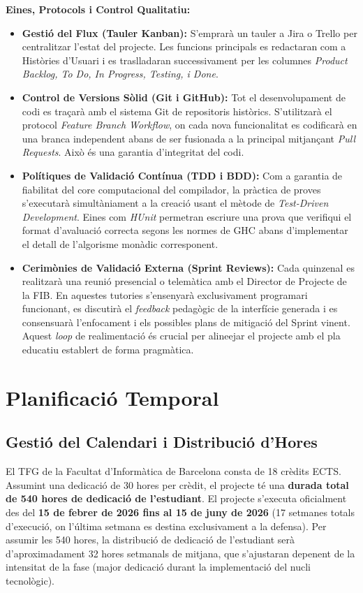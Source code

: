 \textbf{Eines, Protocols i Control Qualitatiu:}
\begin{itemize}
    \item \textbf{Gestió del Flux (Tauler Kanban):} S'emprarà un tauler a Jira o Trello per centralitzar l'estat del projecte. Les funcions principals es redactaran com a Històries d'Usuari i es traslladaran successivament per les columnes \textit{Product Backlog, To Do, In Progress, Testing, i Done}.
    \item \textbf{Control de Versions Sòlid (Git i GitHub):} Tot el desenvolupament de codi es traçarà amb el sistema Git de repositoris històrics. S'utilitzarà el protocol \textit{Feature Branch Workflow}, on cada nova funcionalitat es codificarà en una branca independent abans de ser fusionada a la principal mitjançant \textit{Pull Requests}. Això és una garantia d'integritat del codi.
    \item \textbf{Polítiques de Validació Contínua (TDD i BDD):} Com a garantia de fiabilitat del core computacional del compilador, la pràctica de proves s'executarà simultàniament a la creació usant el mètode de \textit{Test-Driven Development}. Eines com \textit{HUnit} permetran escriure una prova que verifiqui el format d'avaluació correcta segons les normes de GHC abans d'implementar el detall de l'algorisme monàdic corresponent.
    \item \textbf{Cerimònies de Validació Externa (Sprint Reviews):} Cada quinzenal es realitzarà una reunió presencial o telemàtica amb el Director de Projecte de la FIB. En aquestes tutories s'ensenyarà exclusivament programari funcionant, es discutirà el \textit{feedback} pedagògic de la interfície generada i es consensuarà l'enfocament i els possibles plans de mitigació del Sprint vinent. Aquest \textit{loop} de realimentació és crucial per alineejar el projecte amb el pla educatiu establert de forma pragmàtica.
\end{itemize}


\newpage
\section{Planificació Temporal}

\subsection{Gestió del Calendari i Distribució d'Hores}
El TFG de la Facultat d'Informàtica de Barcelona consta de 18 crèdits ECTS. Assumint una dedicació de 30 hores per crèdit, el projecte té una \textbf{durada total de 540 hores de dedicació de l'estudiant}.
El projecte s'executa oficialment des del \textbf{15 de febrer de 2026 fins al 15 de juny de 2026} (17 setmanes totals d'execució, on l'última setmana es destina exclusivament a la defensa). 
Per assumir les 540 hores, la distribució de dedicació de l'estudiant serà d'aproximadament 32 hores setmanals de mitjana, que s'ajustaran depenent de la intensitat de la fase (major dedicació durant la implementació del nucli tecnològic).

